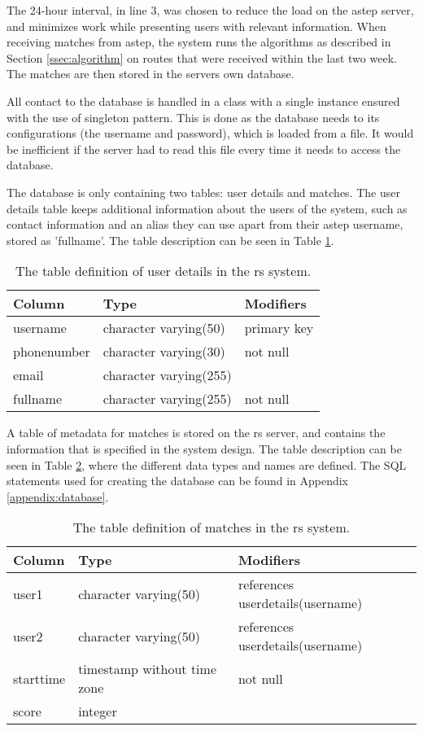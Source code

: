 The 24-hour interval, in line 3, was chosen to reduce the load on the \gls{astep} server, and minimizes work while presenting users with relevant information.
When receiving matches from \gls{astep}, the system runs the algorithms as described in Section \ref{ssec:algorithm} on routes that were received within the last two week.
The matches are then stored in the servers own database.

All contact to the database is handled in a class with a single instance ensured with the use of singleton pattern. 
This is done as the database needs to its configurations (the username and password), which is loaded from a file.
It would be inefficient if the server had to read this file every time it needs to access the database.

The database is only containing two tables: user details and matches.
The user details table keeps additional information about the users of the system, such as contact information and an alias they can use apart from their \gls{astep} username, stored as 'fullname'.
The table description can be seen in Table \ref{tab:userdetails}.

\begin{table}[h]
	\centering
	\begin{tabular}{l l l}
		Column 		& Type                   & Modifiers\\\hline
		username    & character varying(50)  & primary key\\
		phonenumber & character varying(30)  & not null\\
		email       & character varying(255) &\\
		fullname    & character varying(255) & not null\\
	\end{tabular}
	\caption{The table definition of user details in the \gls{rs} system.}
	\label{tab:userdetails}
\end{table}

A table of metadata for matches is stored on the \gls{rs} server, and contains the information that is specified in the system design. 
The table description can be seen in Table \ref{tab:matches}, where the different data types and names are defined.
The SQL statements used for creating the database can be found in Appendix \ref{appendix:database}.

\begin{table}[h]
	\centering
	\begin{tabular}{l l l}
			   Column  &            Type             & Modifiers\\\hline
			 user1     & character varying(50)       & references userdetails(username)\\
			 user2     & character varying(50)       & references userdetails(username)\\
			 starttime & timestamp without time zone & not null\\
			 score     & integer                     &
	\end{tabular}
	\caption{The table definition of matches in the \gls{rs} system.}
	\label{tab:matches}
\end{table}

